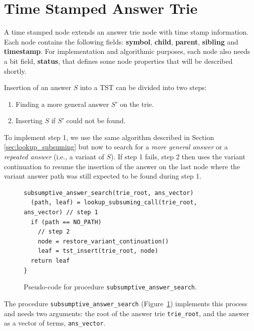 \section{Time Stamped Answer Trie}

A time stamped node extends an answer trie node with time stamp information.
Each node contains the following fields: \textbf{symbol}, \textbf{child}, \textbf{parent}, \textbf{sibling}
and \textbf{timestamp}. For implementation and algorithmic purposes, each node also needs a bit field,
\textbf{status}, that defines some node properties that will be described shortly.

Insertion of an answer $S$ into a TST can be divided into two steps:

\begin{enumerate}
  \item Finding a more general answer $S'$ on the trie.
  \item Inserting $S$ if $S'$ could not be found.
\end{enumerate}

To implement step 1, we use the same algorithm described in Section \ref{sec:lookup_subsuming}
but now to search for a \textit{more general answer} or a \textit{repeated answer} (i.e., a variant of $S$).
If step 1 fails, step 2 then uses the variant continuation to resume the insertion of the answer
on the last node where the variant answer path was still expected to be found during step 1.

\begin{figure}[ht]
\begin{Verbatim}
subsumptive_answer_search(trie_root, ans_vector)
  (path, leaf) = lookup_subsuming_call(trie_root, ans_vector) // step 1
  if (path == NO_PATH)
    // step 2
    node = restore_variant_continuation()
    leaf = tst_insert(trie_root, node)
  return leaf
}
\end{Verbatim}
\caption{Pseudo-code for procedure \texttt{subsumptive\_answer\_search}.}
\label{fig:subsumptive_answer_search}
\end{figure}

The procedure \texttt{subsumptive\_answer\_search} (Figure~\ref{fig:subsumptive_answer_search})
implements this process and needs two arguments: the root of the answer trie \texttt{trie\_root}, and
the answer as a vector of terms, \texttt{ans\_vector}.

